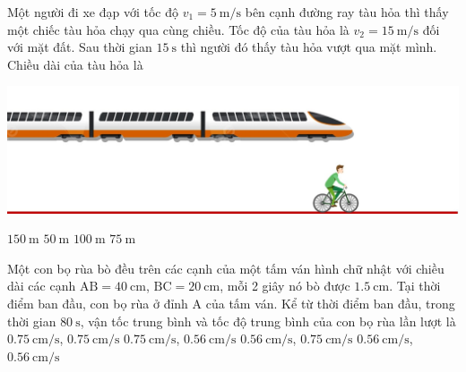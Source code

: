 \begin{ex}
	Một người đi xe đạp với tốc độ $v_1=\SI{5}{\meter/\second}$ bên cạnh đường ray tàu hỏa thì thấy một chiếc tàu hỏa chạy qua cùng chiều. Tốc độ của tàu hỏa là $v_2=\SI{15}{\meter/\second}$ đối với mặt đất. Sau thời gian $\SI{15}{\second}$ thì người đó thấy tàu hỏa vượt qua mặt mình. Chiều dài của tàu hỏa là
	\begin{center}
		\includegraphics[width=0.4\linewidth]{../figs/D10-1-2}
	\end{center}
	\choice
	{\True $\SI{150}{\meter}$}
	{$\SI{50}{\meter}$}
	{$\SI{100}{\meter}$}
	{$\SI{75}{\meter}$}
\end{ex}

\begin{ex}
	Một con bọ rùa bò đều trên các cạnh của một tấm ván hình chữ nhật với chiều dài các cạnh $\mathrm{AB}=\SI{40}{\centi\meter}$, $\mathrm{BC}=\SI{20}{\centi\meter}$, mỗi 2 giây nó bò được $\SI{1.5}{\centi\meter}$. Tại thời điểm ban đầu, con bọ rùa ở đỉnh A của tấm ván. Kể từ thời điểm ban đầu, trong thời gian $\SI{80}{\second}$, vận tốc trung bình và tốc độ trung bình của con bọ rùa lần lượt là	
	\choice
	{$\SI{0.75}{\centi\meter/\second}$, $\SI{0.75}{\centi\meter/\second}$}
	{$\SI{0.75}{\centi\meter/\second}$, $\SI{0.56}{\centi\meter/\second}$}
	{\True $\SI{0.56}{\centi\meter/\second}$, $\SI{0.75}{\centi\meter/\second}$}
	{$\SI{0.56}{\centi\meter/\second}$, $\SI{0.56}{\centi\meter/\second}$}
	\loigiai{}
\end{ex}